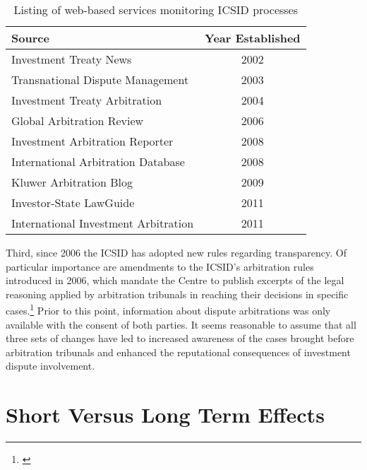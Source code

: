 \documentclass[12pt,onesided]{amsart}
\begin{document}
\begin{table}[ht]
\centering
\caption{Listing of web-based services monitoring ICSID processes}
\label{tab:disputeSites}
\begin{tabular}{lc}
	\hline\hline
	Source & Year Established \\
	\hline
	Investment Treaty News & 2002 \\
	Transnational Dispute Management & 2003 \\
	Investment Treaty Arbitration & 2004 \\
	Global Arbitration Review & 2006 \\
	Investment Arbitration Reporter & 2008 \\
	International Arbitration Database & 2008 \\
	Kluwer Arbitration Blog & 2009 \\
	Investor-State LawGuide & 2011 \\
	International Investment Arbitration & 2011 \\
	\hline\hline
\end{tabular}
\end{table}
\FloatBarrier

Third, since 2006 the ICSID has adopted new rules regarding transparency. Of particular importance are amendments to the ICSID's arbitration rules introduced in 2006, which mandate the Centre to publish excerpts of the legal reasoning applied by arbitration tribunals in reaching their decisions in specific cases.\footnote{\citet{yackee20112006,antonietti:2006}} Prior to this point, information about dispute arbitrations was only available with the consent of both parties. It seems reasonable to assume that all three sets of changes have led to increased awareness of the cases brought before arbitration tribunals and enhanced the reputational consequences of investment dispute involvement.

\section*{Short Versus Long Term Effects}
\end{document}
